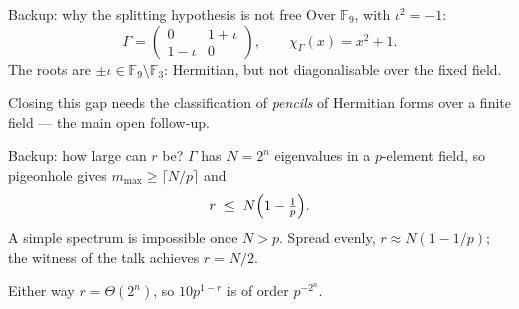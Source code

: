 \documentclass[aspectratio=169,10pt]{beamer}
\newcommand{\FF}{\mathbb{F}}
\begin{document}
\begin{frame}{Backup: why the splitting hypothesis is not free}
  Over $\FF_9$, with $\iota^{2}=-1$:
  \[
    \Gamma=\begin{pmatrix}0 & 1+\iota\\ 1-\iota & 0\end{pmatrix},
    \qquad
    \chi_\Gamma(x)=x^{2}+1 .
  \]
  The roots are $\pm\iota\in\FF_9\setminus\FF_3$: Hermitian, but not
  diagonalisable over the fixed field.

  \vspace{0.5em}
  Closing this gap needs the classification of \emph{pencils} of Hermitian
  forms over a finite field --- the main open follow-up.
\end{frame}

\begin{frame}{Backup: how large can $r$ be?}
  $\Gamma$ has $N=2^{n}$ eigenvalues in a $p$-element field, so pigeonhole
  gives $m_{\max}\ge\lceil N/p\rceil$ and
  \[
    r\;\le\;N\Bigl(1-\tfrac1p\Bigr).
  \]
  A simple spectrum is impossible once $N>p$. Spread evenly,
  $r\approx N(1-1/p)$; the witness of the talk achieves $r=N/2$.

  \vspace{0.5em}
  Either way $r=\Theta(2^{n})$, so $10p^{1-r}$ is of order $p^{-2^{n}}$.
\end{frame}
\end{document}
